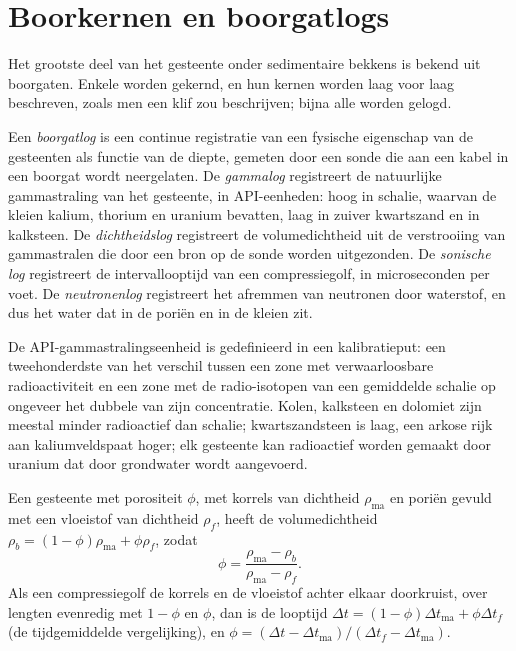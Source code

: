\section{Boorkernen en boorgatlogs}\label{sec:b3:facies-models:logs}

Het grootste deel van het gesteente onder sedimentaire bekkens is bekend uit boorgaten. Enkele
worden gekernd, en hun kernen worden laag voor laag beschreven, zoals men een klif zou beschrijven; bijna alle
worden gelogd.

\begin{definition}[Boorgatlogs]\label{def:b3:facies-models:wireline}
Een \emph{boorgatlog} is een continue registratie van een
fysische eigenschap van de gesteenten als functie van de diepte, gemeten door een sonde die aan
een kabel in een boorgat wordt neergelaten. De \emph{gammalog}
registreert de natuurlijke gammastraling van het gesteente, in API-eenheden: hoog in
schalie, waarvan de kleien kalium, thorium en uranium bevatten, laag in zuiver
kwartszand en in kalksteen. De \emph{dichtheidslog}
registreert de volumedichtheid uit de verstrooiing van gammastralen die door een
bron op de sonde worden uitgezonden. De \emph{sonische log} registreert de
intervallooptijd van een compressiegolf, in microseconden per voet. De
\emph{neutronenlog} registreert het afremmen van neutronen door
waterstof, en dus het water dat in de poriën en in de kleien zit.
\end{definition}

De API-gammastralingseenheid is gedefinieerd in een kalibratieput: een tweehonderdste van
het verschil tussen een zone met verwaarloosbare radioactiviteit en een zone met
de radio-isotopen van een gemiddelde schalie op ongeveer het dubbele van zijn concentratie. Kolen,
kalksteen en dolomiet zijn meestal minder radioactief dan schalie; kwartszandsteen
is laag, een arkose rijk aan kaliumveldspaat hoger; elk gesteente kan radioactief worden
gemaakt door uranium dat door grondwater wordt aangevoerd.

\begin{proposition}\label{prop:b3:facies-models:porosity}
Een gesteente met porositeit $\phi$, met korrels van dichtheid $\rho_{\mathrm{ma}}$ en
poriën gevuld met een vloeistof van dichtheid $\rho_f$, heeft de volumedichtheid
$\rho_b = (1 - \phi)\rho_{\mathrm{ma}} + \phi\rho_f$, zodat
\[
\phi = \frac{\rho_{\mathrm{ma}} - \rho_b}{\rho_{\mathrm{ma}} - \rho_f}.
\]
Als een compressiegolf de korrels en de vloeistof achter elkaar doorkruist, over
lengten evenredig met $1 - \phi$ en $\phi$, dan is de looptijd
$\Delta t = (1 - \phi)\Delta t_{\mathrm{ma}} + \phi\Delta t_f$ (de
tijdgemiddelde vergelijking), en $\phi = (\Delta t - \Delta
t_{\mathrm{ma}})/(\Delta t_f - \Delta t_{\mathrm{ma}})$.
\end{proposition}

